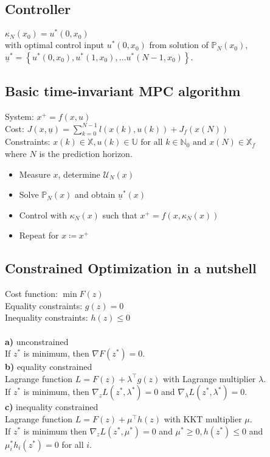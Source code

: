 \documentclass[english]{latex4ei/latex4ei_sheet}
\begin{document}
\begin{sectionbox}

\subsection{Controller}
$\kappa_{N}\left(x_{0}\right)=u^{*}\left(0, x_{0}\right)$ \\ 
with optimal control input $u^{*}\left(0, x_{0}\right)$ from solution of $\mathbb{P}_{N}\left(x_{0}\right)$, \\$\underline{u}^{*}=\left\{u^{*}\left(0, x_{0}\right), u^{*}\left(1, x_{0}\right), \ldots u^{*}\left(N-1, x_{0}\right)\right\}$.\\

\subsection{Basic time-invariant MPC algorithm}
System: $x^{+}=f(x, u)$\\ 
Cost: $J(x, \underline{u})=\sum\limits_{k=0}^{N-1} l(x(k), u(k))+J_{f}(x(N))$ \\
Constraints: $x(k) \in \mathbb{X}, u(k) \in \mathbb{U} \text { for all } k \in \mathbb{N}_{0} \text { and } x(N) \in \mathbb{X}_{f}$ \\
where $N$ is the prediction horizon.\\
\begin{itemize}
    \item Measure $x$, determine $\mathcal{U}_N(x)$
    \item Solve $\mathbb{P}_N(x)$ and obtain $\underline{u}^*(x)$
    \item Control with $\kappa_N(x)$ such that $x^+=f(x,\kappa_N(x))$
    \item Repeat for $x\coloneqq x^+$
\end{itemize}

\subsection{Constrained Optimization in a nutshell}
Cost function: $\min F(z)$\\
Equality constraints: $g(z)=0$\\
Inequality constraints: $h(z)\leq 0$\\
\\
\textbf{a)} unconstrained\\
If $z^*$ is minimum, then $\nabla F(z^*)=0$.\\
\textbf{b)} equality constrained\\
Lagrange function $L=F(z)+\lambda^{\top} g(z)$ with Lagrange multiplier $\lambda$. \\ 
If $z^{*}$ is minimum, then $\nabla_{z} L\left(z^{*}, \lambda^{*}\right)=0$ and $\nabla_{\lambda} L\left(z^{*}, \lambda^{*}\right)=0$. \\
\textbf{c)} inequality constrained\\
Lagrange function $L=F(z)+\mu^{\top} h(z)$ with KKT multiplier $\mu$. \\
If $z^{*}$ is minimum then $\nabla_{z} L\left(z^{*}, \mu^{*}\right)=0$ and $\mu^{*} \geq 0, h\left(z^{*}\right) \leq 0$ and $\mu_{i}^{*} h_{i}\left(z^{*}\right)=0$ for all $i$.


\end{sectionbox}
\end{document}
